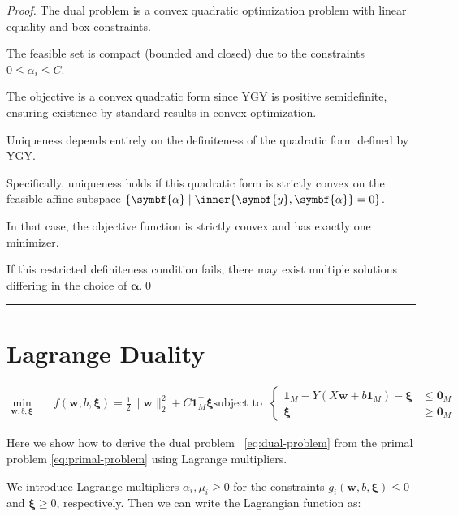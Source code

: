 \begin{proof}{}{}

  The dual problem is a convex quadratic optimization problem with linear equality and box constraints.

  The feasible set is compact (bounded and closed) due to the constraints \(0\leq \alpha_i \le C\).

  The objective is a convex quadratic form since \(\mathrm{Y}\mathrm{G}\mathrm{Y}\) is positive semidefinite, ensuring existence by standard results in convex optimization\cite{nocedal2006numerical}.

  Uniqueness depends entirely on the definiteness of the quadratic form defined by \(\mathrm{Y}\mathrm{G}\mathrm{Y}\).

  Specifically, uniqueness holds if this quadratic form is strictly convex on the feasible affine subspace \(\{\symbf{\alpha}\mid \inner{\symbf{y},\symbf{\alpha}}=0\}\).

  In that case, the objective function is strictly convex and has exactly one minimizer.

  If this restricted definiteness condition fails, there may exist multiple solutions differing in the choice of \(\symbf{\alpha}\).\qed
\end{proof}

\hrule

\section{Lagrange Duality}
\begin{align*}\label{eq:soft-margin-problem}
  \min_{\symbf{w}, b, \symbf{\xi}} \quad & f(\symbf{w}, b, \symbf{\xi}) = \frac{1}{2}\|\symbf{w}\|_2^2 + C\symbf{1}_M^\top \symbf{\xi} \text{subject to} \quad &
  \begin{cases}
    \symbf{1}_M - Y(X\symbf{w} + b\symbf{1}_M) - \symbf{\xi} & \leq \symbf{0}_M \\
    \symbf{\xi}                                              & \geq \symbf{0}_M
  \end{cases}\tag{P}
\end{align*}

Here we show how to derive the dual problem ~\eqref{eq:dual-problem} from the primal problem \eqref{eq:primal-problem} using Lagrange multipliers.

We introduce Lagrange multipliers \(\alpha_i, \mu_i \geq 0\) for the constraints \(g_i(\symbf{w}, b, \symbf{\xi}) \leq 0\) and \(\symbf{\xi} \geq 0\), respectively.
Then we can write the Lagrangian function as:

